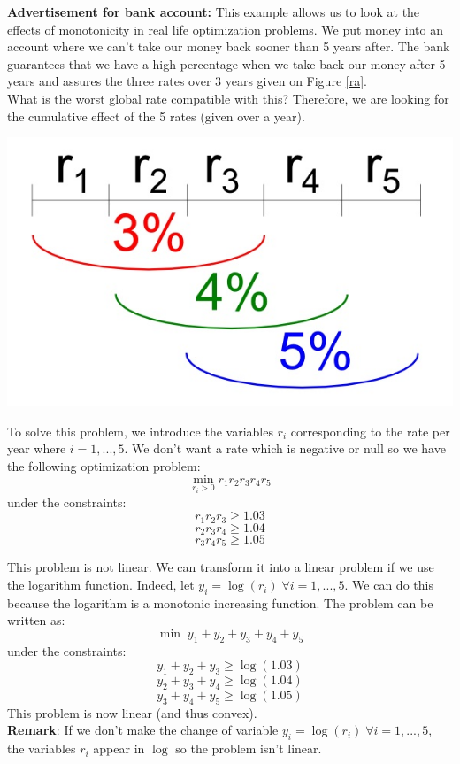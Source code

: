 \begin{example}
\begin{leftbar}
\textbf{Advertisement for bank account:}
This example allows us to look at the effects of monotonicity in real life optimization problems.
We put money into an account where we can't take our money back sooner than 5 years after. The bank guarantees that we have a high percentage when we take back our money after 5 years and assures the three rates over 3 years given on Figure \ref{ra}.\\ 
What is the worst global rate compatible with this? Therefore, we are looking for the cumulative effect of the 5 rates (given over a year). 

\begin{center}
  \includegraphics[scale=0.3]{./images/Course3_rate.jpg}
  \label{ra}
\end{center}

To solve this problem, we introduce the variables $r_i$ corresponding to the rate per year where $i = 1,...,5$. We don't want a rate which is negative or null so we have the following optimization problem:
$$\min \limits _{r_i > 0} r_1r_2r_3r_4r_5 $$
under the constraints: 
$$ r_1r_2r_3 \geq 1.03$$
$$ r_2r_3r_4 \geq 1.04$$
$$ r_3r_4r_5 \geq 1.05$$

This problem is not linear. We can transform it into a linear problem if we use the logarithm function. Indeed, let $y_i = \log(r_i) \; \forall i=1,...,5$. We can do this because the logarithm is a monotonic increasing function. The problem can be written as: 
$$ \min \; y_1 + y_2 + y_3 + y_4 + y_5$$
under the constraints: 
$$ y_1 + y_2 + y_3 \geq \log(1.03)$$
$$ y_2 + y_3 + y_4 \geq \log(1.04)$$
$$ y_3 + y_4 + y_5 \geq \log(1.05)$$
This problem is now linear (and thus convex). \\

\textbf{Remark}: If we don't make the change of variable $y_i = \log(r_i) \; \forall i=1,...,5$,  the variables $r_i$ appear in $\log$ so the problem isn't linear.
\end{leftbar}
\end{example}

